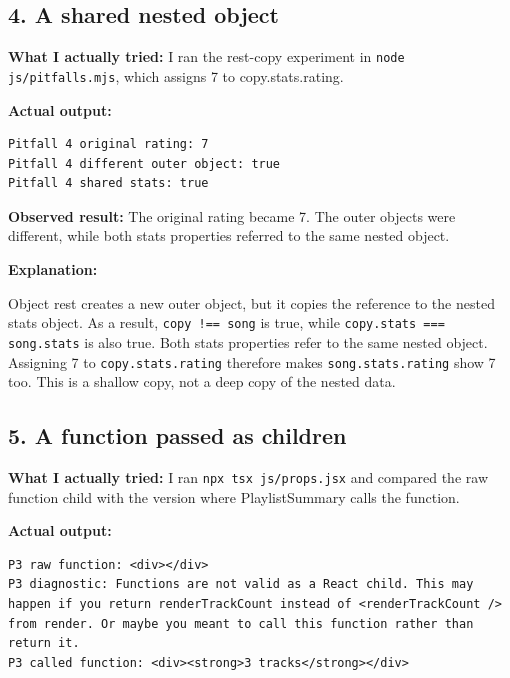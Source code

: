 \documentclass[
  10pt,
  a4paper,
  titlepage]{article}
\newcommand{\passthrough}[1]{#1}
\begin{document}
\subsection{4. A shared nested object}\label{a-shared-nested-object}

\textbf{What I actually tried:} I ran the rest-copy experiment in
\passthrough{\lstinline!node js/pitfalls.mjs!}, which assigns 7 to
copy.stats.rating.

\textbf{Actual output:}

\Needspace{51.5pt}
\begin{lstlisting}
Pitfall 4 original rating: 7
Pitfall 4 different outer object: true
Pitfall 4 shared stats: true
\end{lstlisting}

\textbf{Observed result:} The original rating became 7. The outer
objects were different, while both stats properties referred to the same
nested object.


\textbf{Explanation:}

Object rest creates a new outer object, but it copies the reference to
the nested stats object. As a result,
\passthrough{\lstinline"copy !== song"} is true, while
\passthrough{\lstinline!copy.stats === song.stats!} is also true. Both
stats properties refer to the same nested object. Assigning 7 to
\passthrough{\lstinline!copy.stats.rating!} therefore makes
\passthrough{\lstinline!song.stats.rating!} show 7 too. This is a
shallow copy, not a deep copy of the nested data.

\subsection{5. A function passed as
children}\label{a-function-passed-as-children}

\textbf{What I actually tried:} I ran
\passthrough{\lstinline!npx tsx js/props.jsx!} and compared the raw
function child with the version where PlaylistSummary calls the
function.

\textbf{Actual output:}

\Needspace{51.5pt}
\begin{lstlisting}
P3 raw function: <div></div>
P3 diagnostic: Functions are not valid as a React child. This may happen if you return renderTrackCount instead of <renderTrackCount /> from render. Or maybe you meant to call this function rather than return it.
P3 called function: <div><strong>3 tracks</strong></div>
\end{lstlisting}
\end{document}

